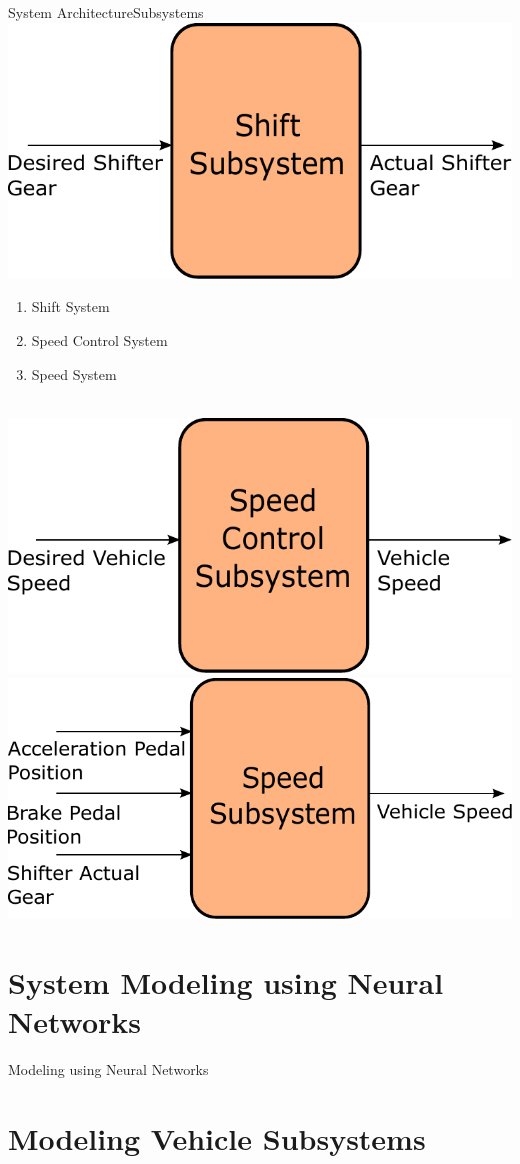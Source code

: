 \documentclass{beamer}
\begin{document}
\begin{frame}{System Architecture}{Subsystems}
	\centering \includegraphics[width=.45\linewidth]{figs/inkscape/shiftModelArchitecture}\quad%
	\centering \begin{minipage}[b][0.4\textheight][c]{.45\linewidth} \begin{enumerate} \item Shift System \item 		Speed Control System \item Speed System \end{enumerate} \end{minipage}\\[1em]
	\centering \includegraphics[width=.45\linewidth]{figs/inkscape/speedControlModelArchitecture}\quad%
	\centering \includegraphics[width=.45\linewidth]{figs/inkscape/speedModelArchitecture}
\end{frame}
\section{System Modeling using Neural Networks}

\begin{frame}{Modeling using Neural Networks}{}

\end{frame}
\section{Modeling Vehicle Subsystems}
\end{document}
